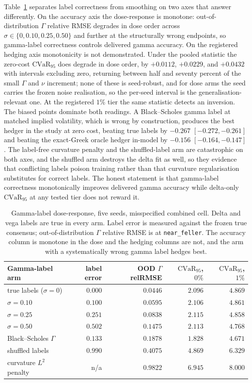 \documentclass[10pt]{article}
\begin{document}
Table~\ref{tab:dose} separates label correctness from smoothing on two axes that
answer differently. On the accuracy axis the dose-response is monotone:
out-of-distribution $\Gamma$ relative RMSE degrades in dose order across
$\sigma\in\{0,0.10,0.25,0.50\}$ and further at the structurally wrong endpoints, so
gamma-label correctness controls delivered gamma accuracy. On the registered hedging
axis monotonicity is not demonstrated. Under the pooled statistic the zero-cost
$\mathrm{CVaR}_{95}$ does degrade in dose order, by $+0.0112$, $+0.0229$, and
$+0.0432$ with intervals excluding zero, returning between half and seventy percent
of the small $\Gamma$ and $\nu$ increment; none of these is seed-robust, and for
dose arms the seed carries the frozen noise realisation, so the per-seed interval is
the generalisation-relevant one. At the registered $1\%$ tier the same statistic
detects an inversion. The biased points dominate both readings. A Black--Scholes
gamma label at matched implied volatility, which is wrong by construction, produces
the best hedger in the study at zero cost, beating true labels by $-0.267$
$[-0.272,-0.261]$ and beating the exact-Greek oracle hedger in-model by $-0.156$
$[-0.164,-0.147]$. The label-free curvature penalty and the shuffled-label arm are
catastrophic on both axes, and the shuffled arm destroys the delta fit as well, so
they evidence that conflicting labels poison training rather than that curvature
regularisation substitutes for correct labels. The honest statement is that
gamma-label correctness monotonically improves delivered gamma accuracy while
delta-only $\mathrm{CVaR}_{95}$ at any tested tier does not reward it.

\begin{table}[!htbp]
\centering\footnotesize\setlength{\tabcolsep}{5pt}
\begin{tabular}{@{}lrrrr@{}}
\toprule
Gamma-label arm & label error & OOD $\Gamma$ relRMSE & $\mathrm{CVaR}_{95}$, $0\%$ & $\mathrm{CVaR}_{95}$, $1\%$ \\
\midrule
true labels ($\sigma=0$) & $0.000$ & $0.0446$ & $2.096$ & $4.869$ \\
$\sigma=0.10$ & $0.100$ & $0.0595$ & $2.106$ & $4.861$ \\
$\sigma=0.25$ & $0.251$ & $0.0838$ & $2.115$ & $4.858$ \\
$\sigma=0.50$ & $0.502$ & $0.1475$ & $2.113$ & $4.768$ \\
Black--Scholes $\Gamma$ & $0.133$ & $0.1878$ & $\mathbf{1.828}$ & $\mathbf{4.671}$ \\
shuffled labels & $0.990$ & $0.4075$ & $4.869$ & $6.329$ \\
curvature $L^{2}$ penalty & n/a & $0.9822$ & $6.945$ & $8.000$ \\
\bottomrule
\end{tabular}
\caption{Gamma-label dose-response, five seeds, misspecified combined cell.
Delta and vega labels are true in every arm. Label error is measured against the
frozen true consensus; out-of-distribution $\Gamma$ relative RMSE is at
\texttt{near\_feller}. The accuracy column is monotone in the dose and the hedging
columns are not, and the arm with a systematically wrong gamma label hedges best.}
\label{tab:dose}
\end{table}
\end{document}
